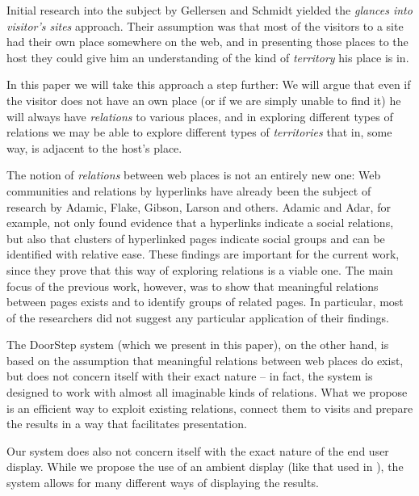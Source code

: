 \documentclass[a4paper]{danarticle}
\theoremstyle{remark}
\begin{document}
    Initial research into the subject by Gellersen and Schmidt\cite{webaware}
    yielded the
    \textit{glances into visitor's sites} approach. Their assumption was 
    that most of
    the visitors to a site had their own place somewhere on the web, and in
    presenting those places to the host they could give him an understanding of the
    kind of \textit{territory} his place is in.
    
    In this paper we will take this approach a step further: We will argue that
    even if the visitor does not have an own place (or if we are
    simply unable to find it) he will always have \textit{relations} to various
    places, and in exploring different types of relations we may be able to
    explore different types of \textit{territories} that in, some way, is adjacent to
    the host's place.
    
    The notion of \emph{relations} between web places is not an entirely new 
    one: Web communities and relations by hyperlinks have already 
    been the subject of research by Adamic\cite{links},
    Flake\cite{flake}, Gibson\cite{gibson}, 
    Larson\cite{larson} and others. 
    Adamic and Adar, for example, not only found 
    evidence that a hyperlinks indicate a social relations, but also that 
    clusters of hyperlinked pages indicate social groups and can be identified 
    with relative ease\cite{links}. These findings are important for the current work, 
    since they prove that this way of exploring relations is a viable one. The main
    focus of the previous work, however, was to show that meaningful relations 
    between pages exists and to identify groups of related pages. In particular,
    most of the researchers did not suggest any particular application of their
    findings.
    
    The DoorStep system (which we present in this paper), 
    on the other hand, is based on the assumption that 
    meaningful relations between web places do exist, but does not concern itself 
    with their exact nature -- in fact, the system is designed 
    to work with almost all imaginable kinds of relations. What we propose is an 
    efficient way to exploit existing relations, connect them to visits 
    and prepare the results in a way that facilitates presentation.
    
    Our system does also not concern itself with the exact 
    nature of the end user display. While we propose the use of an ambient 
    display (like that used in \cite{ambient}), the system allows for many 
    different ways of displaying the results.
    
\end{document}
